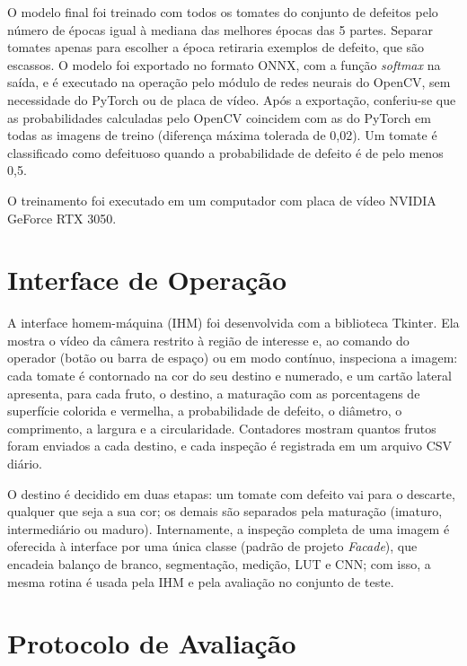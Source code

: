 O modelo final foi treinado com todos os tomates do conjunto de defeitos pelo número de épocas igual à mediana das melhores épocas das 5 partes. Separar tomates apenas para escolher a época retiraria exemplos de defeito, que são escassos. O modelo foi exportado no formato ONNX, com a função \textit{softmax} na saída, e é executado na operação pelo módulo de redes neurais do OpenCV, sem necessidade do PyTorch ou de placa de vídeo. Após a exportação, conferiu-se que as probabilidades calculadas pelo OpenCV coincidem com as do PyTorch em todas as imagens de treino (diferença máxima tolerada de 0,02). Um tomate é classificado como defeituoso quando a probabilidade de defeito é de pelo menos 0,5.

O treinamento foi executado em um computador com placa de vídeo NVIDIA GeForce RTX 3050.

\section{Interface de Operação}

A interface homem-máquina (IHM) foi desenvolvida com a biblioteca Tkinter. Ela mostra o vídeo da câmera restrito à região de interesse e, ao comando do operador (botão ou barra de espaço) ou em modo contínuo, inspeciona a imagem: cada tomate é contornado na cor do seu destino e numerado, e um cartão lateral apresenta, para cada fruto, o destino, a maturação com as porcentagens de superfície colorida e vermelha, a probabilidade de defeito, o diâmetro, o comprimento, a largura e a circularidade. Contadores mostram quantos frutos foram enviados a cada destino, e cada inspeção é registrada em um arquivo CSV diário.

O destino é decidido em duas etapas: um tomate com defeito vai para o descarte, qualquer que seja a sua cor; os demais são separados pela maturação (imaturo, intermediário ou maduro). Internamente, a inspeção completa de uma imagem é oferecida à interface por uma única classe (padrão de projeto \textit{Facade}), que encadeia balanço de branco, segmentação, medição, LUT e CNN; com isso, a mesma rotina é usada pela IHM e pela avaliação no conjunto de teste.

\section{Protocolo de Avaliação}

